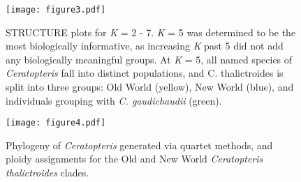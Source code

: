 \documentclass[12pt]{article}
\begin{document}
\begin{figure}[H]
\centering
\texttt{[image: figure3.pdf]}
\caption{STRUCTURE plots for \textit{K} = 2 - 7. \textit{K} = 5 was determined to be the most biologically informative, as increasing \textit{K} past 5 did not add any biologically meaningful groups. At \textit{K} = 5, all named species of \textit{Ceratopteris} fall into distinct populations, and C. thalictroides is split into three groups: Old World (yellow), New World (blue), and individuals grouping with \textit{C. gaudichaudii} (green).}
\label{structure}
\end{figure}

\begin{figure}[H]
\centering
\texttt{[image: figure4.pdf]}
\caption{Phylogeny of \textit{Ceratopteris} generated via quartet methods, and ploidy assignments for the Old and New World \textit{Ceratopteris thalictroides} clades.}
\label{phy}
\end{figure}

\vspace{30cm}
\printbibliography
\end{document}
